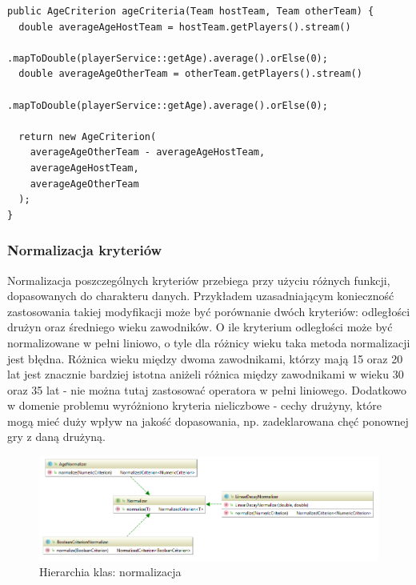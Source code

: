 \begin{minipage}{\linewidth}
\begin{lstlisting}[label=list:age-crit-gen, caption=Generacja kryterium różnicy wieku między dwoma drużynami, basicstyle=\footnotesize\ttfamily]
public AgeCriterion ageCriteria(Team hostTeam, Team otherTeam) {
  double averageAgeHostTeam = hostTeam.getPlayers().stream()
                .mapToDouble(playerService::getAge).average().orElse(0);
  double averageAgeOtherTeam = otherTeam.getPlayers().stream()
                .mapToDouble(playerService::getAge).average().orElse(0);

  return new AgeCriterion(
    averageAgeOtherTeam - averageAgeHostTeam, 
    averageAgeHostTeam, 
    averageAgeOtherTeam
  );
}
\end{lstlisting}
\end{minipage}

\subsubsection{Normalizacja kryteriów}

 Normalizacja poszczególnych kryteriów przebiega przy użyciu różnych funkcji, dopasowanych do charakteru danych. Przykładem uzasadniającym konieczność zastosowania takiej modyfikacji może być porównanie dwóch kryteriów: odległości drużyn oraz średniego wieku zawodników. O ile kryterium odległości może być normalizowane w pełni liniowo, o tyle dla różnicy wieku taka metoda normalizacji jest błędna. Różnica wieku między dwoma zawodnikami, którzy mają 15 oraz 20 lat jest znacznie bardziej istotna aniżeli różnica między zawodnikami w wieku 30 oraz 35 lat - nie można tutaj zastosować operatora w pełni liniowego. Dodatkowo w domenie problemu wyróżniono kryteria nieliczbowe - cechy drużyny, które mogą mieć duży wpływ na jakość dopasowania, np. zadeklarowana chęć ponownej gry z daną drużyną.  
 

 
\begin{figure}[H]
\centering
\includegraphics[width=\linewidth]{06-implementacja/rys/normalizer-hierarchy.PNG}
\caption{Hierarchia klas: normalizacja}
\label{fig:criterion-classes}
\end{figure}

